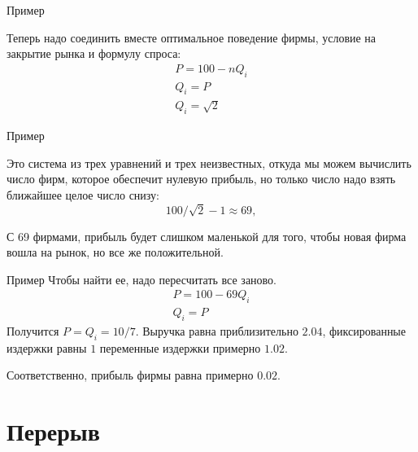 \documentclass{beamer}
\begin{document}
\begin{frame}{Пример}

Теперь надо соединить вместе оптимальное поведение фирмы, условие на закрытие рынка и формулу спроса:
\begin{gather*}
P = 100 - n Q_i\\
Q_i = P\\
Q_i = \sqrt{2}
\end{gather*}

\end{frame}

\begin{frame}{Пример}

Это система из трех уравнений и трех неизвестных, откуда мы можем вычислить число фирм, которое обеспечит нулевую прибыль, но только число надо взять ближайшее целое число снизу:
$$100/\sqrt{2} - 1 \approx 69,$$

С 69 фирмами, прибыль будет слишком маленькой для того, чтобы новая фирма вошла на рынок, но все же положительной.

\end{frame}

\begin{frame}{Пример}
Чтобы найти ее, надо пересчитать все заново.
\begin{gather*}
P = 100 - 69 Q_i\\
Q_i = P
\end{gather*}
Получится $P = Q_i = 10/7$. Выручка равна приблизительно $2.04$, фиксированные издержки равны $1$ переменные издержки примерно $1.02$. 

Соответственно, прибыль фирмы равна примерно $0.02$.

\end{frame}

\section{Перерыв}
\end{document}
